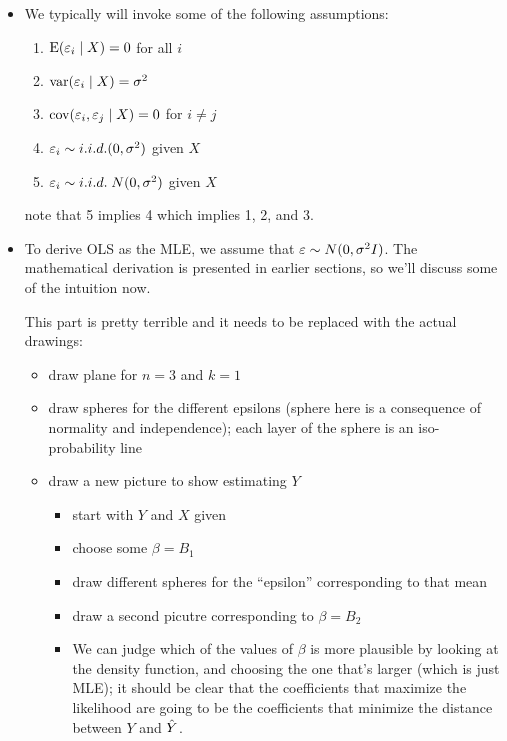 \begin{itemize}[leftmargin=0pt]
\item We typically will invoke some of the following assumptions:
  \begin{enumerate}
  \item $\operatorname{E}(\varepsilon_i \mid X) = 0$ for all $i$
  \item $\operatorname{var}(\varepsilon_i \mid X) = \sigma^2$
  \item $\operatorname{cov}(\varepsilon_i, \varepsilon_j \mid X) = 0$ for $i \neq j$
  \item $\varepsilon_i \sim i.i.d.(0,\sigma^2)$ given $X$
  \item $\varepsilon_i \sim i.i.d.\; N(0,\sigma^2)$ given $X$
  \end{enumerate}
  note that 5 implies 4 which implies 1, 2, and 3.

\item To derive OLS as the MLE, we assume that $\varepsilon \sim N(0,\sigma^2 I)$.
  The mathematical derivation is presented in earlier sections, so
  we'll discuss some of the intuition now.

  This part is pretty terrible and it needs to be replaced with the
  actual drawings:
  \begin{itemize}
  \item draw plane for $n = 3$ and $k = 1$
  \item draw spheres for the different epsilons (sphere here is a
    consequence of normality and independence); each layer of the
    sphere is an iso-probability line
  \item draw a new picture to show estimating $Y$
    \begin{itemize}
    \item start with $Y$ and $X$ given
    \item choose some $\beta = B_1$
    \item draw different spheres for the ``epsilon'' corresponding to that mean
    \item draw a second picutre corresponding to $\beta = B_2$
    \item We can judge which of the values of $\beta$ is more plausible by
      looking at the density function, and choosing the one that's
      larger (which is just MLE); it should be clear that the
      coefficients that maximize the likelihood are going to be the
      coefficients that minimize the distance between $Y$ and $\hat{Y}$.
    \end{itemize}
  \end{itemize}


\end{itemize}
